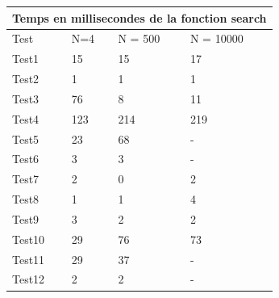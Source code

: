 \documentclass[utf8]{article}
\begin{document}
\begin{large}
  \begin{tabular}{ |p{3cm}||p{3cm}|p{3cm}|p{3cm}|  }
    \hline
    \multicolumn{4}{|c|}{Temps en millisecondes de la fonction search} \\
    \hline
    Test   & N=4 & N = 500 & N = 10000                                 \\
    \hline
    Test1  & 15  & 15      & 17                                        \\
    Test2  & 1   & 1       & 1                                         \\
    Test3  & 76  & 8       & 11                                        \\
    Test4  & 123 & 214     & 219                                       \\
    Test5  & 23  & 68      & -                                         \\
    Test6  & 3   & 3       & -                                         \\
    Test7  & 2   & 0       & 2                                         \\
    Test8  & 1   & 1       & 4                                         \\
    Test9  & 3   & 2       & 2                                         \\
    Test10 & 29  & 76      & 73                                        \\
    Test11 & 29  & 37      & -                                         \\
    Test12 & 2   & 2       & -                                         \\
    \hline
  \end{tabular}


\end{large}
\end{document}
